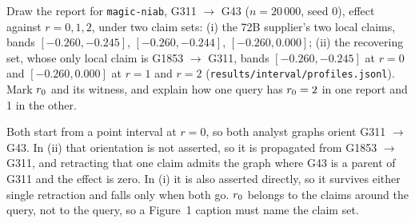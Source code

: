 \begin{exercicio}[metodo=drawing,conceito=testemunha]
Draw the report for \texttt{magic-niab}, G311 $\to$ G43 ($n = 20\,000$, seed 0), effect against
$r = 0, 1, 2$, under two claim sets: (i) the 72B supplier's two local claims,
bands $[-0.260, -0.245]$, $[-0.260, -0.244]$, $[-0.260, 0.000]$; (ii) the recovering set, whose only
local claim is G1853 $\to$ G311, bands $[-0.260, -0.245]$ at $r = 0$ and $[-0.260, 0.000]$ at $r = 1$
and $r = 2$ (\texttt{results/interval/profiles.jsonl}). Mark $r_{0}$ and its witness, and explain how one query has $r_{0} = 2$ in one report and 1 in the
other.
\end{exercicio}
\begin{solucao}
\begin{center}
\end{center}
Both start from a point interval at $r = 0$, so both analyst graphs orient G311 $\to$ G43. In (ii) that
orientation is not asserted, so it is propagated from G1853 $\to$ G311, and retracting that one claim
admits the graph where G43 is a parent of G311 and the effect is zero. In (i) it is also asserted
directly, so it survives either single retraction and falls only when both go. $r_{0}$ belongs to the
claims around the query, not to the query, so a Figure~1 caption must name the claim set.
\end{solucao}

